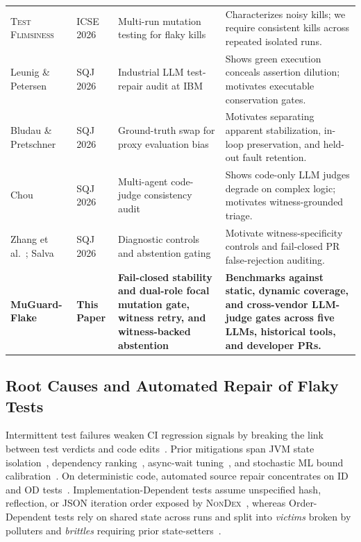 \begin{table}[t]
\begin{tabular}{>{\raggedright\arraybackslash}p{2.7cm}>{\raggedright\arraybackslash}p{1.8cm}>{\raggedright\arraybackslash}p{4.0cm}>{\raggedright\arraybackslash}p{5.6cm}}
\textsc{Test Flimsiness}~\cite{parry2026flimsiness} & ICSE 2026 & Multi-run mutation testing for flaky kills & Characterizes noisy kills; we require consistent kills across repeated isolated runs. \\
Leunig \& Petersen~\cite{leunig2026perl} & SQJ 2026 & Industrial LLM test-repair audit at IBM & Shows green execution conceals assertion dilution; motivates executable conservation gates. \\
Bludau \& Pretschner~\cite{bludau2026szz} & SQJ 2026 & Ground-truth swap for proxy evaluation bias & Motivates separating apparent stabilization, in-loop preservation, and held-out fault retention. \\
Chou~\cite{chou2026aijudge} & SQJ 2026 & Multi-agent code-judge consistency audit & Shows code-only LLM judges degrade on complex logic; motivates witness-grounded triage. \\
Zhang et al.~\cite{zhang2026typerepair}; Salva~\cite{salva2026nltestrunner} & SQJ 2026 & Diagnostic controls and abstention gating & Motivate witness-specificity controls and fail-closed PR false-rejection auditing. \\
\midrule
\textbf{MuGuard-Flake} & \textbf{This Paper} & \textbf{Fail-closed stability and dual-role focal mutation gate, witness retry, and witness-backed abstention} & \textbf{Benchmarks against static, dynamic coverage, and cross-vendor LLM-judge gates across five LLMs, historical tools, and developer PRs.} \\
\bottomrule
\end{tabular}
\end{table}

\subsection{Root Causes and Automated Repair of Flaky Tests}

Intermittent test failures weaken CI regression signals by breaking the link between test verdicts and code edits~\cite{luo2014empirical,lam2020lifecycle,parry2021survey}. Prior mitigations span JVM state isolation~\cite{bell2014vmvm}, dependency ranking~\cite{gambi2018pradet,lam2019idflakies,rahman2025rankf,foster2026flakefighters}, async-wait tuning~\cite{rahman2024flakesync,rahman2026tdrepro}, and stochastic ML bound calibration~\cite{dutta2021flex}. On deterministic code, automated source repair concentrates on ID and OD tests~\cite{gyori2016nondex,wang2022ipflakies,rafi2026reproflake}. Implementation-Dependent tests assume unspecified hash, reflection, or JSON iteration order exposed by \textsc{NonDex}~\cite{gyori2016nondex,zhang2021dexfix}, whereas Order-Dependent tests rely on shared state across runs and split into \emph{victims} broken by polluters and \emph{brittles} requiring prior state-setters~\cite{shi2019ifixflakies,wang2022ipflakies}.

